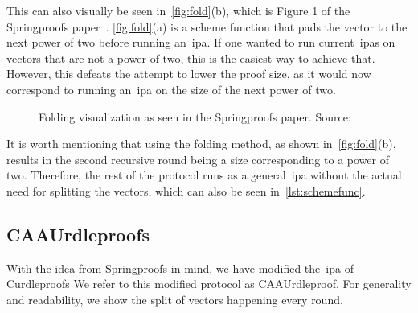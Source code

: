 This can also visually be seen in~\autoref{fig:fold}(b), which is Figure 1 of the Springproofs paper~\cite{zhang2024springproofs}.
\autoref{fig:fold}(a) is a scheme function that pads the vector to the next power of two before running an~\gls{ipa}.
If one wanted to run current~\glspl{ipa} on vectors that are not a power of two, this is the easiest way to achieve that.
However, this defeats the attempt to lower the proof size, as it would now correspond to running an~\gls{ipa} on the size of the next power of two.

\begin{figure}[!htb]
    \centering
    \qquad
    \caption{Folding visualization as seen in the Springproofs paper. Source:~\cite{zhang2024springproofs}}%
    \label{fig:fold}%
\end{figure}

It is worth mentioning that using the folding method, as shown in~\autoref{fig:fold}(b), results in the second recursive round being a size corresponding to a power of two.
Therefore, the rest of the protocol runs as a general~\gls{ipa} without the actual need for splitting the vectors, which can also be seen in~\autoref{lst:schemefunc}.

\subsection{CAAUrdleproofs}\label{subsec:approach-CAAUrdleproofs}
With the idea from Springproofs in mind, we have modified the~\gls{ipa} of Curdleproofs
We refer to this modified protocol as CAAUrdleproof.
For generality and readability, we show the split of vectors happening every round.

